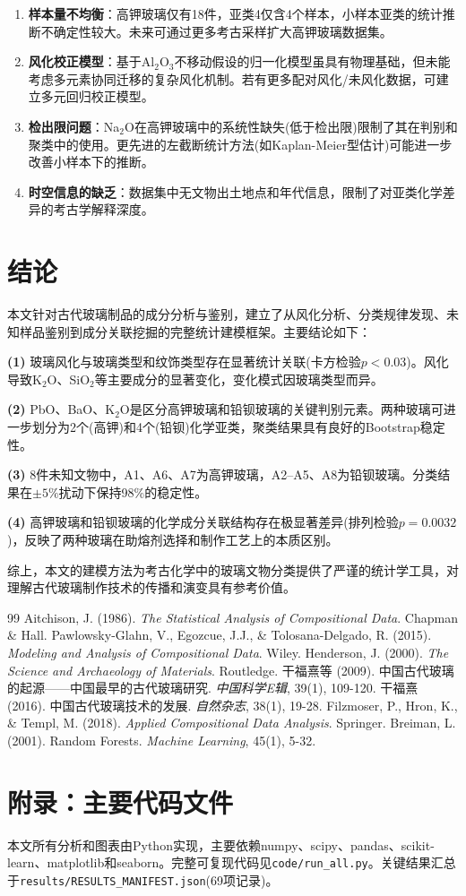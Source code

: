 \documentclass[12pt,a4paper]{ctexart}
\begin{document}
\begin{enumerate}[label=\textbf{(\arabic*)}]
    \item \textbf{样本量不均衡}：高钾玻璃仅有18件，亚类4仅含4个样本，小样本亚类的统计推断不确定性较大。未来可通过更多考古采样扩大高钾玻璃数据集。
    \item \textbf{风化校正模型}：基于Al$_2$O$_3$不移动假设的归一化模型虽具有物理基础，但未能考虑多元素协同迁移的复杂风化机制。若有更多配对风化/未风化数据，可建立多元回归校正模型。
    \item \textbf{检出限问题}：Na$_2$O在高钾玻璃中的系统性缺失(低于检出限)限制了其在判别和聚类中的使用。更先进的左截断统计方法(如Kaplan-Meier型估计)可能进一步改善小样本下的推断。
    \item \textbf{时空信息的缺乏}：数据集中无文物出土地点和年代信息，限制了对亚类化学差异的考古学解释深度。
\end{enumerate}

\section{结论}

本文针对古代玻璃制品的成分分析与鉴别，建立了从风化分析、分类规律发现、未知样品鉴别到成分关联挖掘的完整统计建模框架。主要结论如下：

\textbf{(1)} 玻璃风化与玻璃类型和纹饰类型存在显著统计关联(卡方检验$p<0.03$)。风化导致K$_2$O、SiO$_2$等主要成分的显著变化，变化模式因玻璃类型而异。

\textbf{(2)} PbO、BaO、K$_2$O是区分高钾玻璃和铅钡玻璃的关键判别元素。两种玻璃可进一步划分为2个(高钾)和4个(铅钡)化学亚类，聚类结果具有良好的Bootstrap稳定性。

\textbf{(3)} 8件未知文物中，A1、A6、A7为高钾玻璃，A2--A5、A8为铅钡玻璃。分类结果在$\pm5\%$扰动下保持98\%的稳定性。

\textbf{(4)} 高钾玻璃和铅钡玻璃的化学成分关联结构存在极显著差异(排列检验$p=0.0032$)，反映了两种玻璃在助熔剂选择和制作工艺上的本质区别。

综上，本文的建模方法为考古化学中的玻璃文物分类提供了严谨的统计学工具，对理解古代玻璃制作技术的传播和演变具有参考价值。

\begin{thebibliography}{99}
 Aitchison, J. (1986). \textit{The Statistical Analysis of Compositional Data}. Chapman \& Hall.
 Pawlowsky-Glahn, V., Egozcue, J.J., \& Tolosana-Delgado, R. (2015). \textit{Modeling and Analysis of Compositional Data}. Wiley.
 Henderson, J. (2000). \textit{The Science and Archaeology of Materials}. Routledge.
 干福熹等 (2009). 中国古代玻璃的起源——中国最早的古代玻璃研究. \textit{中国科学E辑}, 39(1), 109-120.
 干福熹 (2016). 中国古代玻璃技术的发展. \textit{自然杂志}, 38(1), 19-28.
 Filzmoser, P., Hron, K., \& Templ, M. (2018). \textit{Applied Compositional Data Analysis}. Springer.
 Breiman, L. (2001). Random Forests. \textit{Machine Learning}, 45(1), 5-32.
\end{thebibliography}

\newpage
\section*{附录：主要代码文件}

本文所有分析和图表由Python实现，主要依赖numpy、scipy、pandas、scikit-learn、matplotlib和seaborn。完整可复现代码见\texttt{code/run\_all.py}。关键结果汇总于\texttt{results/RESULTS\_MANIFEST.json}(69项记录)。
\end{document}

